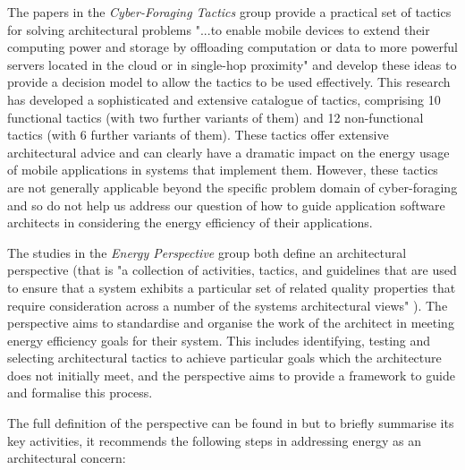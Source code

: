 The papers in the \emph{Cyber-Foraging Tactics} group provide a practical set of tactics for solving architectural problems "...to enable mobile devices to extend their computing power and storage by offloading computation or data to more powerful servers located in the cloud or in single-hop proximity" \cite{lewis2015-foragingtactics} and develop these ideas to provide a decision model to allow the tactics to be used effectively.  This research has developed a sophisticated and extensive catalogue of tactics, comprising 10 functional tactics (with two further variants of them) and 12 non-functional tactics (with 6 further variants of them).  These tactics offer extensive architectural advice and can clearly have a dramatic impact on the energy usage of mobile applications in systems that implement them.  However, these tactics are not generally applicable beyond the specific problem domain of cyber-foraging and so do not help us address our question of how to guide application software architects in considering the energy efficiency of their applications.

The studies in the \emph{Energy Perspective} group both define an architectural perspective (that is "a collection of activities, tactics, and guidelines that are used to ensure that a system exhibits a particular set of related quality properties that require consideration across a number of the systems architectural views" \cite{woods2005-perspectives}).  The perspective aims to standardise and organise the work of the architect in meeting energy efficiency goals for their system.  This includes identifying, testing and selecting architectural tactics to achieve particular goals which the architecture does not initially meet, and the perspective aims to provide a framework to guide and formalise this process.

The full definition of the perspective can be found in \cite{jagroep2017-energyperspective} but to briefly summarise its key activities, it recommends the following steps in addressing energy as an architectural concern:


